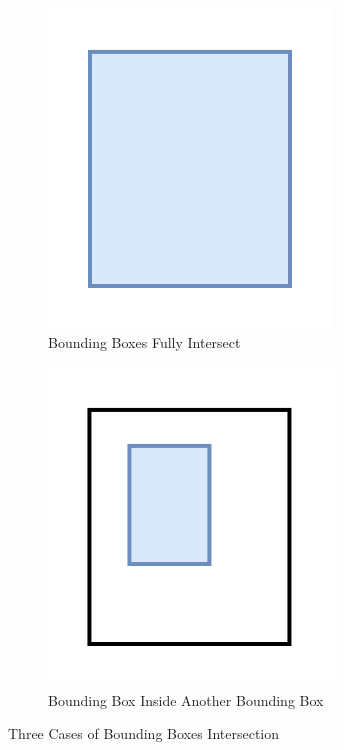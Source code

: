 \begin{figure}[p]
        \begin{subfigure}[][][t]{.49\textwidth}
          \centering
          \includegraphics[width=.66\linewidth]{figures/iou-intersect-fully.png}
          \caption{Bounding Boxes Fully Intersect}
          \label{fig:iou-intersect-fully}
        \end{subfigure}\hfill
        \begin{subfigure}[][][t]{.49\textwidth}
          \centering
          \includegraphics[width=.66\linewidth]{figures/iou-intersect-inside.png}
          \caption{Bounding Box Inside Another Bounding Box}
          \label{fig:iou-intersect-inside}
        \end{subfigure}
        \caption{Three Cases of Bounding Boxes Intersection}
        \label{fig:intersections-iou}
    \end{figure}
